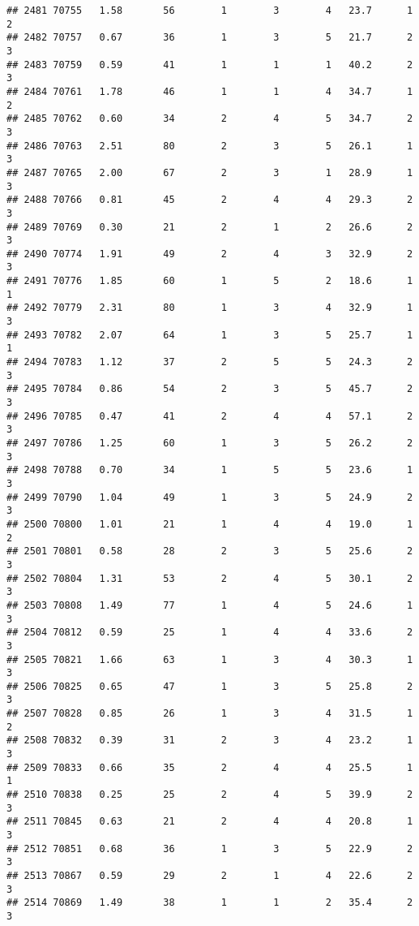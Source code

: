 \documentclass[
]{article}
\begin{document}
\begin{verbatim}
## 2481 70755   1.58       56        1        3        4   23.7      1      2
## 2482 70757   0.67       36        1        3        5   21.7      2      3
## 2483 70759   0.59       41        1        1        1   40.2      2      3
## 2484 70761   1.78       46        1        1        4   34.7      1      2
## 2485 70762   0.60       34        2        4        5   34.7      2      3
## 2486 70763   2.51       80        2        3        5   26.1      1      3
## 2487 70765   2.00       67        2        3        1   28.9      1      3
## 2488 70766   0.81       45        2        4        4   29.3      2      3
## 2489 70769   0.30       21        2        1        2   26.6      2      3
## 2490 70774   1.91       49        2        4        3   32.9      2      3
## 2491 70776   1.85       60        1        5        2   18.6      1      1
## 2492 70779   2.31       80        1        3        4   32.9      1      3
## 2493 70782   2.07       64        1        3        5   25.7      1      1
## 2494 70783   1.12       37        2        5        5   24.3      2      3
## 2495 70784   0.86       54        2        3        5   45.7      2      3
## 2496 70785   0.47       41        2        4        4   57.1      2      3
## 2497 70786   1.25       60        1        3        5   26.2      2      3
## 2498 70788   0.70       34        1        5        5   23.6      1      3
## 2499 70790   1.04       49        1        3        5   24.9      2      3
## 2500 70800   1.01       21        1        4        4   19.0      1      2
## 2501 70801   0.58       28        2        3        5   25.6      2      3
## 2502 70804   1.31       53        2        4        5   30.1      2      3
## 2503 70808   1.49       77        1        4        5   24.6      1      3
## 2504 70812   0.59       25        1        4        4   33.6      2      3
## 2505 70821   1.66       63        1        3        4   30.3      1      3
## 2506 70825   0.65       47        1        3        5   25.8      2      3
## 2507 70828   0.85       26        1        3        4   31.5      1      2
## 2508 70832   0.39       31        2        3        4   23.2      1      3
## 2509 70833   0.66       35        2        4        4   25.5      1      1
## 2510 70838   0.25       25        2        4        5   39.9      2      3
## 2511 70845   0.63       21        2        4        4   20.8      1      3
## 2512 70851   0.68       36        1        3        5   22.9      2      3
## 2513 70867   0.59       29        2        1        4   22.6      2      3
## 2514 70869   1.49       38        1        1        2   35.4      2      3

\end{verbatim}
\end{document}
